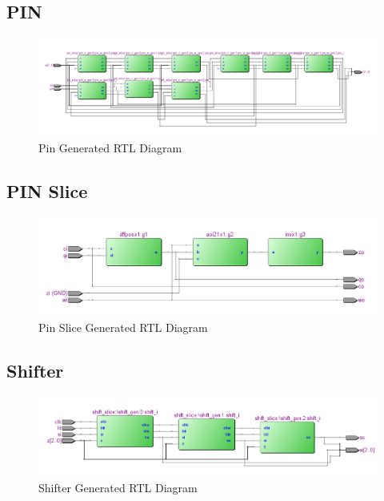    \subsection{PIN}
        
        \begin{figure}[H]
            \centering
            \includegraphics[width=0.5\linewidth]{../../doc/rtl_pics/pin_rtl.png}
            \caption{Pin Generated RTL Diagram}
        \end{figure}
    \subsection{PIN Slice}
        
        \begin{figure}[H]
            \centering
            \includegraphics[width=\linewidth]{../../doc/rtl_pics/pin_slice_rtl.png}
            \caption{Pin Slice Generated RTL Diagram}
        \end{figure}
    \newpage
    \subsection{Shifter}
        
        \begin{figure}[H]
            \centering
            \includegraphics[width=\linewidth]{../../doc/rtl_pics/shift_rtl.png}
            \caption{Shifter Generated RTL Diagram}
        \end{figure}
    \newpage
